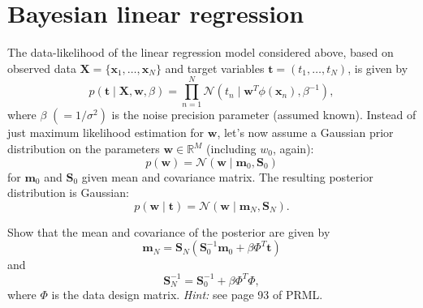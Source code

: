 \documentclass[11pt,noanswers,addpoints]{exam}
\newcommand{\R}{\mathbb R}
\newcommand{\X}{\mathbf X}
\renewcommand{\S}{\mathbf S}
\newcommand{\x}{\mathbf x}
\newcommand{\w}{\mathbf w}
\renewcommand{\t}{\mathbf t}
\newcommand{\m}{\mathbf m}
\newcommand{\N}{\mathcal N}
\begin{document}
\section{Bayesian linear regression}
The data-likelihood of the linear regression model considered above, based on observed data $\X=\{\x_1,\ldots,\x_N\}$ and target variables $\t = (t_1,\ldots,t_N)$, is given by 
$$p(\t\mid \X,\w,\beta) = \prod_{n=1}^N\N(t_n\mid \w^T\phi(\x_n), \beta^{-1}),$$
where $\beta$ $(=1/\sigma^2)$ is the noise precision parameter (assumed known).
Instead of just maximum likelihood estimation for $\w$, let's now assume a Gaussian prior distribution on the parameters $\w\in\R^M$ (including $w_0$, again):
$$p(\w) = \N(\w\mid \m_0, \S_0 )$$
for $\m_0$ and $\S_0$ given mean and covariance matrix.
The resulting posterior distribution is Gaussian:
$$p(\w\mid \t) = \N(\w\mid \m_N, \S_N).$$
\begin{questions}
\question Show that the mean and covariance of the posterior are given by 
$$\m_N=\S_N(\S_0^{-1}\m_0 + \beta\Phi^T\t)$$ and $$\S_N^{-1}=\S_0^{-1}+\beta\Phi^T\Phi,$$ where $\Phi$ is the data design matrix. \emph{Hint:} see page 93 of PRML.
\end{questions}
\end{document}
